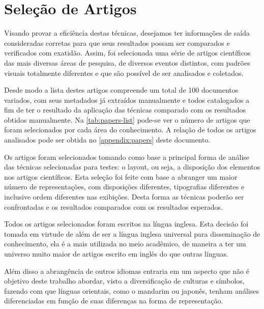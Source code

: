 \section{Seleção de Artigos}

Visando provar a eficiência destas técnicas, desejamos ter informações de saída consideradas corretas para que seus resultados possam ser comparados e verificados com exatidão. Assim, foi selecionada uma série de artigos científicos das mais diversas áreas de pesquisa, de diversos eventos distintos, com padrões visuais totalmente diferentes e que são possível de ser analisados e coletados.


Desde modo a lista destes artigos compreende um total de 100 documentos variados, com seus metadados já extraídos manualmente e todos catalogados a fim de ter o resultado da aplicação das técnicas comparado com os resultados obtidos manualmente. Na \autoref{tab:papers-list} pode-se ver o número de artigos que foram selecionados por cada área do conhecimento. A relação de todos os artigos analisados pode ser obtida no \autoref{appendix:papers} deste documento.

Os artigos foram selecionados tomando como base a principal forma de análise das técnicas selecionadas para testes: o layout, ou seja, a disposição dos elementos nos artigos científicos. Esta seleção foi feite com base a abranger um maior número de representações, com disposições diferentes, tipografias diferentes e inclusive ordem diferentes nas exibições. Desta forma as técnicas poderão ser confrontadas e os resultados comparados com os resultados esperados.


Todos os artigos selecionados foram escritos na língua inglesa. Esta decisão foi tomada em virtude de além de ser a língua inglesa universal para disseminação de conhecimento, ela é a mais utilizada no meio acadêmico, de maneira a ter um universo muito maior de artigos escrito em inglês do que outras línguas.

Além disso a abrangência de outros idiomas entraria em um aspecto que não é objetivo deste trabalho abordar, visto a diversificação de culturas e símbolos, fazendo com que línguas orientais, como o mandarim ou japonês, tenham análises diferenciadas em função de suas diferenças na forma de representação.

